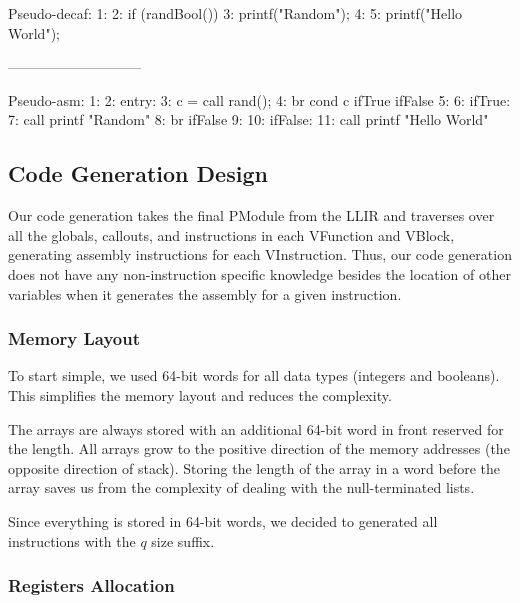 \documentclass[11pt]{article}
\begin{document}
\begin{verbbox}
Pseudo-decaf:
1:
2:   if (randBool()) {
3:       printf("Random");
4:   }
5:   printf("Hello World\n");

-----------------------------

Pseudo-asm:
1:
2:   entry:
3:       c = call rand();
4:           br cond c ifTrue ifFalse
5:    
6:   ifTrue:
7:       call printf "Random"
8:       br ifFalse
9:    
10:   ifFalse:
11:       call printf "Hello World\n"
\end{verbbox}
\begin{center}\theverbbox\end{center}

\subsection{Code Generation Design}

\par Our code generation takes the final PModule from the LLIR and traverses over all the globals, callouts, and instructions in each VFunction and VBlock, generating assembly instructions for each VInstruction. Thus, our code generation does not have any non-instruction specific knowledge besides the location of other variables when it generates the assembly for a given instruction.

\subsubsection{Memory Layout}

\par To start simple, we used 64-bit words for all data types (integers and booleans). This simplifies the memory layout and reduces the complexity.

\par The arrays are always stored with an additional 64-bit word in front reserved for the length. All arrays grow to the positive direction of the memory addresses (the opposite direction of stack). Storing the length of the array in a word before the array saves us from the complexity of dealing with the null-terminated lists.

\par Since everything is stored in 64-bit words, we decided to generated all instructions with the $q$ size suffix.

\subsubsection{Registers Allocation}
\end{document}
